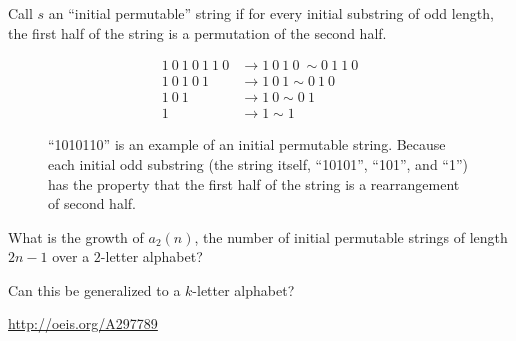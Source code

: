 \documentclass{article}
\begin{document}
Call $s$ an ``initial permutable'' string if for every initial substring of
odd length, the first half of the string is a permutation of the second half.
\begin{figure}[!h]
  \centering
  \begin{align*}
    1\ 0\ 1\ 0\ 1\ 1\ 0 &\rightarrow 1\ 0\ 1\ 0\ \sim 0\ 1\ 1\ 0\\
    1\ 0\ 1\ 0\ 1 &\rightarrow 1\ 0\ 1 \sim 0\ 1\ 0\\
    1\ 0\ 1 &\rightarrow 1\ 0 \sim 0\ 1\\
    1 &\rightarrow 1 \sim 1
  \end{align*}
  \caption{
    ``1010110'' is an example of an initial permutable string. Because each
    initial odd substring (the string itself, ``10101'', ``101'', and ``1'')
    has the property that the first half of the string is a rearrangement of
    second half.
  }
\end{figure}

\begin{question}
  What is the growth of $a_2(n)$, the number of initial permutable strings of
  length $2n - 1$ over a $2$-letter alphabet?
\end{question}
\begin{related}
  \item Can this be generalized to a $k$-letter alphabet?
\end{related}
\begin{references}
  \item \url{http://oeis.org/A297789}
\end{references}
\end{document}
